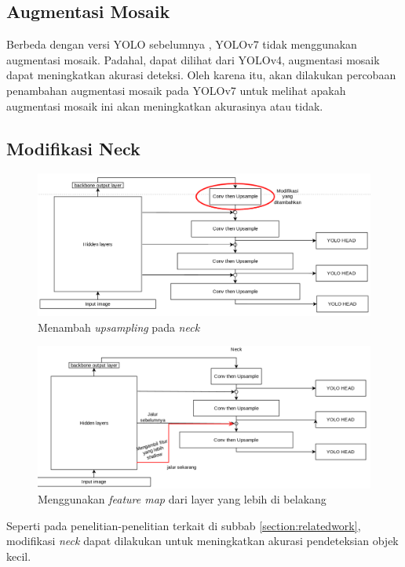   \subsection{Augmentasi Mosaik}
    Berbeda dengan versi YOLO sebelumnya \parencites{yolov4}{yolov5}, YOLOv7 tidak menggunakan augmentasi mosaik.
    Padahal, dapat dilihat dari YOLOv4, augmentasi mosaik dapat meningkatkan akurasi deteksi.
    Oleh karena itu, akan dilakukan percobaan penambahan augmentasi mosaik pada YOLOv7 untuk melihat apakah augmentasi mosaik ini akan meningkatkan akurasinya atau tidak.
  \subsection{Modifikasi Neck}
    \begin{figure}[ht]
      \centering
      \includegraphics[scale=0.5]{pictures/add-more-upsampling.png}
      \caption{Menambah \emph{upsampling} pada \emph{neck}}
      \label{fig:neckaddupsampling}
    \end{figure}
    \begin{figure}[ht]
      \centering
      \includegraphics[scale=0.5]{pictures/neck-move-back.png}
      \caption{Menggunakan \emph{feature map} dari layer yang lebih di belakang}
      \label{fig:neckmoveback}
    \end{figure}
    Seperti pada penelitian-penelitian terkait di subbab \ref{section:relatedwork}, modifikasi \emph{neck} dapat dilakukan untuk meningkatkan akurasi pendeteksian objek kecil.
